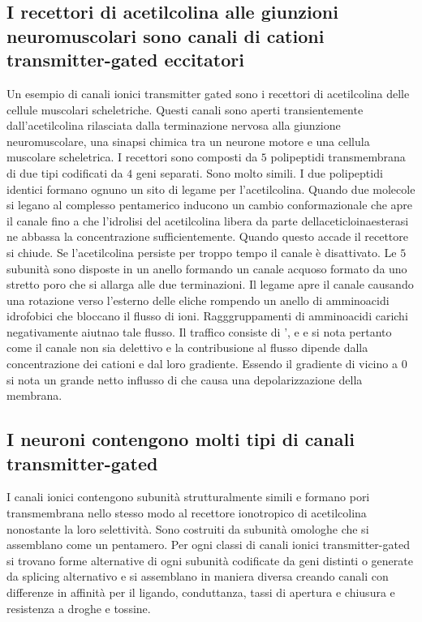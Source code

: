 \subsection{I recettori di acetilcolina alle giunzioni neuromuscolari sono canali di cationi transmitter-gated eccitatori}
Un esempio di canali ionici transmitter gated sono i recettori di acetilcolina delle cellule muscolari scheletriche. Questi canali sono aperti transientemente dall'acetilcolina 
rilasciata dalla terminazione nervosa alla giunzione neuromuscolare, una sinapsi chimica tra un neurone motore e una cellula muscolare scheletrica. I recettori sono composti da $5$ 
polipeptidi transmembrana di due tipi codificati da $4$ geni separati. Sono molto simili. I due polipeptidi identici formano ognuno un sito di legame per l'acetilcolina. Quando
due molecole si legano al complesso pentamerico inducono un cambio conformazionale che apre il canale fino a che l'idrolisi del acetilcolina libera da parte dellaceticloinaesterasi ne
abbassa la concentrazione sufficientemente. Quando questo accade il recettore si chiude. Se l'acetilcolina persiste per troppo tempo il canale \`e disattivato. Le $5$ subunit\`a sono
disposte in un anello formando un canale acquoso formato da uno stretto poro che si allarga alle due terminazioni. Il legame apre il canale causando una rotazione verso l'esterno delle
eliche rompendo un anello di amminoacidi idrofobici che bloccano il flusso di ioni. Ragggruppamenti di amminoacidi carichi negativamente aiutnao tale flusso. Il traffico consiste di 
',  e  e si nota pertanto come il canale non sia delettivo e la contribusione al flusso dipende dalla concentrazione dei cationi e dal loro gradiente. Essendo
il gradiente di  vicino a $0$ si nota un grande netto influsso di  che causa una depolarizzazione della membrana. 
\subsection{I neuroni contengono molti tipi di canali transmitter-gated}
I canali ionici contengono subunit\`a strutturalmente simili e formano pori transmembrana nello stesso modo al recettore ionotropico di acetilcolina nonostante la loro selettivit\`a. 
Sono costruiti da subunit\`a omologhe che si assemblano come un pentamero. Per ogni classi di canali ionici transmitter-gated si trovano forme alternative di ogni subunit\`a codificate
da geni distinti o generate da splicing alternativo e si assemblano in maniera diversa creando canali con differenze in affinit\`a per il ligando, conduttanza, tassi di apertura e 
chiusura e resistenza a droghe e tossine. 
